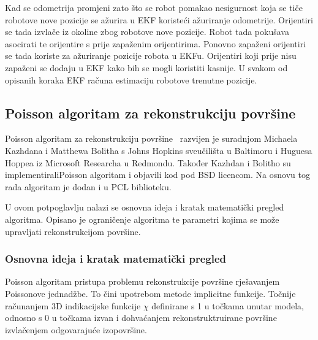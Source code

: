 Kad se odometrija promjeni zato što se robot pomakao nesigurnost koja se
tiče robotove nove pozicije se ažurira u EKF koristeći ažuriranje
odometrije. Orijentiri se tada izvlače iz okoline zbog robotove nove
pozicije. Robot tada pokušava asocirati te orijentire s prije zapaženim
orijentirima. Ponovno zapaženi orijentiri se tada koriste za ažuriranje
pozicije robota u EKFu. Orijentiri koji prije nisu zapaženi se dodaju u
EKF kako bih se mogli koristiti kasnije. U svakom od opisanih koraka EKF
računa estimaciju robotove trenutne pozicije.



\newpage
\subsection{Poisson algoritam za rekonstrukciju površine} %
\label{sub:Poisson}
Poisson algoritam za rekonstrukciju površine~\cite{Kazhdan:2006}
razvijen je suradnjom Michaela Kazhdana i Matthewa Bolitha s Johns
Hopkins sveučilišta u Baltimoru i Huguesa Hoppea iz Microsoft Researcha
u Redmondu. Također Kazhdan i Bolitho su implementirali\footnotemark[1]
Poisson algoritam i objavili kod pod BSD licencom. Na osnovu tog rada
algoritam je dodan i u PCL biblioteku.

U ovom potpoglavlju nalazi se osnovna ideja i kratak matematički pregled
algoritma. Opisano je ograničenje algoritma te parametri kojima se može
upravljati rekonstrukcijom površine.



\subsubsection{Osnovna ideja i kratak matematički pregled} %
\label{ssub:Osnovna ideja i kratak matematički pregled}

Poisson algoritam pristupa problemu rekonstrukcije površine rješavanjem
Poissonove jednadžbe. To čini upotrebom metode implicitne funkcije.
Točnije računanjem 3D indikacijske funkcije \(\chi\) definirane s 1 u
točkama unutar modela, odnosno s 0 u točkama izvan i dohvaćanjem
rekonstruktruirane površine izvlačenjem odgovarajuće izopovršine.

